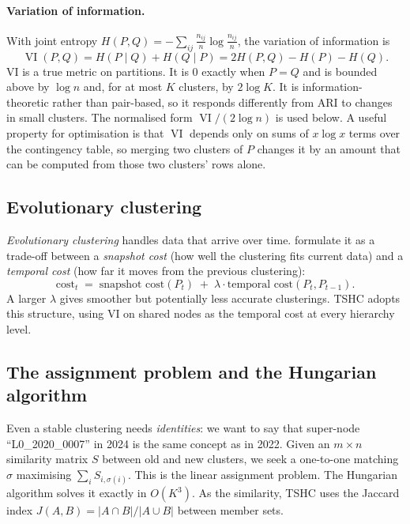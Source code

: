 \documentclass[11pt,a4paper]{article}
\theoremstyle{remark}
\newcommand{\VI}{\operatorname{VI}}
\begin{document}
\paragraph{Variation of information.}
With joint entropy $H(P,Q)=-\sum_{ij}\frac{n_{ij}}{n}\log\frac{n_{ij}}{n}$, the
variation of information \citep{meila2007} is
\begin{equation}
  \VI(P,Q)=H(P\mid Q)+H(Q\mid P)=2H(P,Q)-H(P)-H(Q).
  \label{eq:vi}
\end{equation}
VI is a true metric on partitions. It is $0$ exactly when $P=Q$ and is bounded above
by $\log n$ and, for at most $K$ clusters, by $2\log K$. It is information-theoretic
rather than pair-based, so it responds differently from ARI to changes in small
clusters. The normalised form $\VI/(2\log n)$ is used below. A useful property for
optimisation is that $\VI$ depends only on sums of $x\log x$ terms over the contingency
table, so merging two clusters of $P$ changes it by an amount that can be computed
from those two clusters' rows alone.

\subsection{Evolutionary clustering}

\emph{Evolutionary clustering} handles data that arrive over time.
\citet{chi2007evolutionary} formulate it as a trade-off between a
\emph{snapshot cost} (how well the clustering fits current data) and a
\emph{temporal cost} (how far it moves from the previous clustering):
\[
  \text{cost}_t \;=\; \text{snapshot cost}(P_t)\;+\;\lambda\cdot\text{temporal cost}(P_t,P_{t-1}).
\]
A larger $\lambda$ gives smoother but potentially less accurate clusterings. TSHC
adopts this structure, using VI on shared nodes as the temporal cost at every
hierarchy level.

\subsection{The assignment problem and the Hungarian algorithm}

Even a stable clustering needs \emph{identities}: we want to say that super-node
``L0\_2020\_0007'' in 2024 is the same concept as in 2022. Given an $m\times n$
similarity matrix $S$ between old and new clusters, we seek a one-to-one matching
$\sigma$ maximising $\sum_i S_{i,\sigma(i)}$. This is the linear assignment problem.
The Hungarian algorithm \citep{kuhn1955} solves it exactly in $O(K^3)$. As the
similarity, TSHC uses the Jaccard index
$J(A,B)=|A\cap B|/|A\cup B|$ between member sets.
\end{document}

